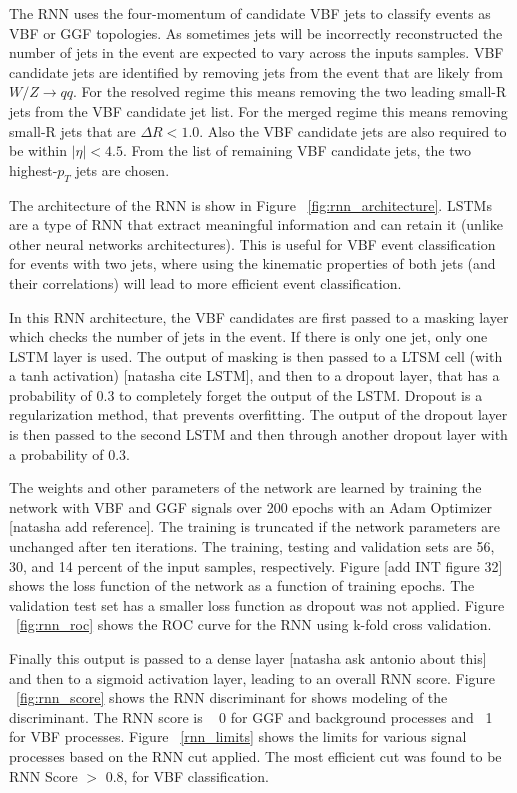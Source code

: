 The RNN uses the four-momentum of candidate VBF jets to classify events as VBF or GGF topologies. As sometimes jets will be incorrectly reconstructed the number of jets in the event are expected to vary across the inputs samples. VBF candidate jets are identified by removing jets from the event that are likely from $W/Z \rightarrow qq$. For the resolved regime this means removing the two leading small-R jets from the VBF candidate jet list. For the merged regime this means removing small-R jets that are $\Delta R < 1.0$.  Also the VBF candidate jets are also required to be within $|\eta| < 4.5$. From the list of remaining VBF candidate jets, the two highest-$p_{T}$ jets are chosen. 

The architecture of the RNN is show in Figure ~\ref{fig:rnn_architecture}. LSTMs are a type of RNN that extract meaningful information and can retain it (unlike other neural networks architectures). This is useful for VBF event classification for events with two jets, where using the kinematic properties of both jets (and their correlations) will lead to more efficient event classification.

In this RNN architecture, the VBF candidates are first passed to a masking layer which checks the number of jets in the event. If there is only one jet, only one LSTM layer is used. The output of masking is then passed to a LTSM cell (with a tanh activation)  [natasha cite LSTM], and then to a dropout layer, that has a probability of 0.3 to completely forget the output of the LSTM. Dropout is a regularization method, that prevents overfitting. The output of the dropout layer is then passed to the second LSTM and then through another dropout layer with a probability of 0.3. 

The weights and other parameters of the network are learned by training the network with VBF and GGF signals over 200 epochs with an Adam Optimizer [natasha add reference]. The training is truncated if the network parameters are unchanged after ten iterations. The training, testing and validation sets are 56, 30, and 14 percent of the input samples, respectively. Figure [add INT figure 32] shows the loss function of the network as a function of training epochs. The validation test set has a smaller loss function as dropout was not applied. Figure ~\ref{fig:rnn_roc} shows the ROC curve for the RNN using k-fold cross validation. 

Finally this output is passed to a dense layer [natasha ask antonio about this] and then to a sigmoid activation layer, leading to an overall RNN score. Figure ~\ref{fig:rnn_score} shows the RNN discriminant for shows modeling of the discriminant. The RNN score is ~ 0 for GGF and background processes and ~1 for VBF processes. Figure ~\ref{rnn_limits} shows the limits for various signal processes based on the RNN cut applied. The most efficient cut was found to be RNN Score $>$ 0.8, for VBF classification.


